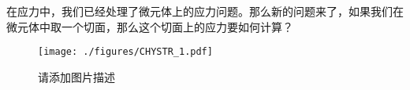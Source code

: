 
在应力中，我们已经处理了微元体上的应力问题。那么新的问题来了，如果我们在微元体中取一个切面，那么这个切面上的应力要如何计算？
\begin{figure}[ht]
\centering
\texttt{[image: ./figures/CHYSTR\_1.pdf]}
\caption{请添加图片描述} \label{CHYSTR_fig1}
\end{figure}